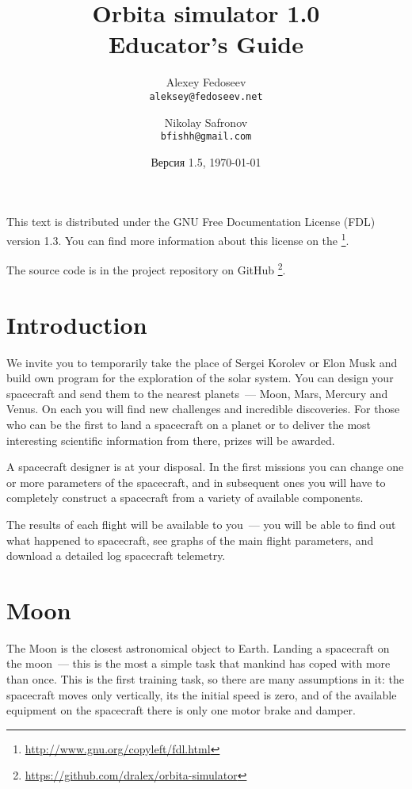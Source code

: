\documentclass[12pt,a4paper]{article}
\begin{document}
\title{%
  \textbf{Orbita simulator 1.0} \\
    Educator's Guide}

\author{
  Alexey Fedoseev\\
  \texttt{aleksey@fedoseev.net}
  \and
  Nikolay Safronov\\
  \texttt{bfishh@gmail.com}
}

\date{Версия 1.5, \today}

\maketitle

This text is distributed under the GNU Free Documentation License (FDL) version
1.3. You can find more information about this license on the
\footnote{\url{http://www.gnu.org/copyleft/fdl.html}}.

The source code is in the project repository on GitHub
\footnote{\url{https://github.com/dralex/orbita-simulator}}.

\tableofcontents

\clearpage
\section{Introduction}

We invite you to temporarily take the place of Sergei Korolev or Elon Musk and build own program for the exploration of the solar system. You can design your spacecraft and send them to the nearest planets~--- Moon, Mars, Mercury and Venus. On each you will find new challenges and incredible discoveries. For those who can be the first to land a spacecraft on a planet or to deliver the most interesting scientific information from there, prizes will be awarded.

A spacecraft designer is at your disposal. In the first missions you can change one or more parameters of the spacecraft, and in subsequent ones you will have to completely construct a spacecraft from a variety of available components.

The results of each flight will be available to you~--- you will be able to find out what happened to spacecraft, see graphs of the main flight parameters, and download a detailed log spacecraft telemetry.

\section{Moon}

The Moon is the closest astronomical object to Earth. Landing a spacecraft on the moon~--- this is the most a simple task that mankind has coped with more than once. This is the first training task, so there are many assumptions in it: the spacecraft moves only vertically, its the initial speed is zero, and of the available equipment on the spacecraft there is only one motor brake and damper.
\end{document}
